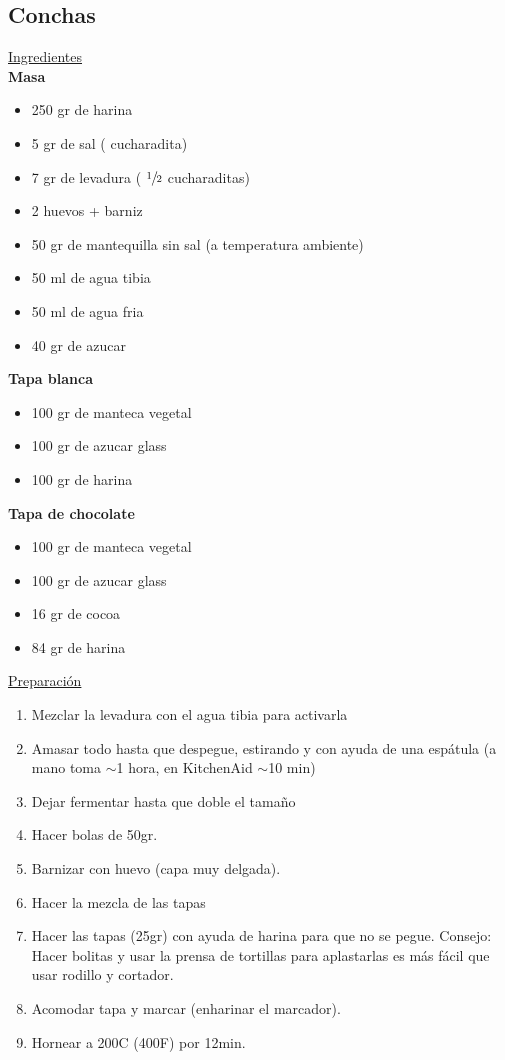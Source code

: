 \subsection{Conchas}

\underline{Ingredientes}\\
\textbf{Masa}
\begin{itemize}
\item 250 gr de harina
\item 5 gr de sal ( cucharadita)
\item 7 gr de levadura ( $\sfrac{1}{2}$ cucharaditas)
\item 2 huevos +  barniz
\item 50 gr de mantequilla sin sal (a temperatura ambiente)
\item 50 ml de agua tibia
\item 50 ml de agua fria
\item 40 gr de azucar
\end{itemize}


\textbf{Tapa blanca}
\begin{itemize}
\item 100 gr de manteca vegetal
\item 100 gr de azucar glass
\item 100 gr de harina
\end{itemize}

\textbf{Tapa de chocolate}
\begin{itemize}
\item 100 gr de manteca vegetal
\item 100 gr de azucar glass
\item 16 gr de cocoa
\item 84 gr de harina
\end{itemize}

\underline{Preparaci\'on}

\begin{enumerate}
\item Mezclar la levadura con el agua tibia para activarla
\item Amasar todo hasta que despegue, estirando y con ayuda de una espátula (a mano toma $\sim$1 hora, en KitchenAid $\sim$10 min)
\item Dejar fermentar hasta que doble el tamaño
\item Hacer bolas de 50gr.
\item Barnizar con huevo (capa muy delgada).
\item Hacer la mezcla de las tapas
\item Hacer las tapas (25gr) con ayuda de harina para que no se pegue. Consejo: Hacer bolitas y usar la prensa de tortillas para aplastarlas es m\'as f\'acil que usar rodillo y cortador. 
\item Acomodar tapa y marcar (enharinar el marcador).
\item Hornear a 200C (400F) por 12min.
\end{enumerate}
